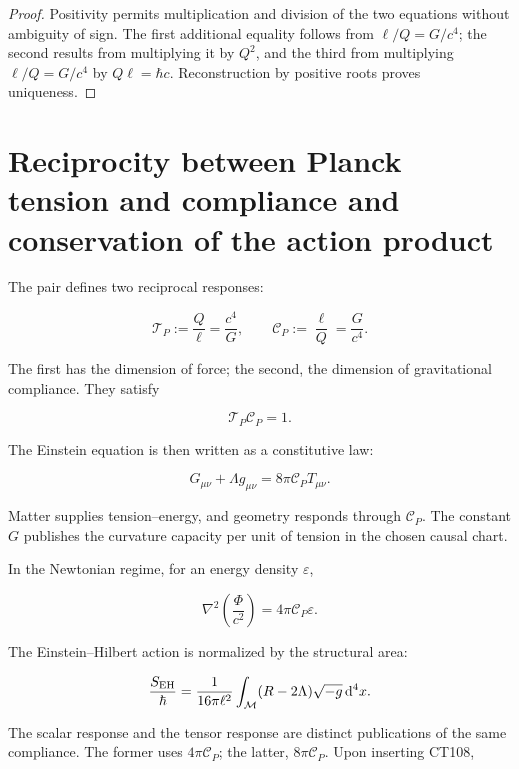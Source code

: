 \begin{proof}
Positivity permits multiplication and division of the two equations without
ambiguity of sign. The first additional equality follows from
\(\ell/Q=G/c^4\); the second results from multiplying it by \(Q^2\), and the
third from multiplying \(\ell/Q=G/c^4\) by
\(Q\ell=\hbar c\). Reconstruction by positive roots proves
uniqueness.
\end{proof}

\section{Reciprocity between Planck tension and compliance and conservation of the action product}

The pair defines two reciprocal responses:

\begin{equation}
\mathscr T_P:=\frac{Q}{\ell}=\frac{c^4}{G},
\qquad
\mathscr C_P:=\frac{\ell}{Q}=\frac{G}{c^4}.
\label{eq:rm-tension-compliance}
\end{equation}

The first has the dimension of force; the second, the dimension of
gravitational compliance. They satisfy

\[
\mathscr T_P\mathscr C_P=1.
\]

The Einstein equation is then written as a constitutive law:

\begin{equation}
\boxed{
G_{\mu\nu}+\Lambda g_{\mu\nu}
=8\pi\mathscr C_P T_{\mu\nu}.}
\label{eq:rm-einstein-compliance}
\end{equation}

Matter supplies tension--energy, and geometry responds through
\(\mathscr C_P\). The constant \(G\) publishes the curvature capacity per
unit of tension in the chosen causal chart.

In the Newtonian regime, for an energy density
\(\varepsilon\),

\[
\nabla^2\!\left(\frac{\Phi}{c^2}\right)
=4\pi\mathscr C_P\varepsilon.
\]

The Einstein--Hilbert action is normalized by the structural area:

\begin{equation}
\frac{S_{\rm EH}}{\hbar}
=\frac{1}{16\pi\ell^2}
\int_{\mathcal M}(R-2\Lambda)\sqrt{-g}\,\mathrm d^4x.
\label{eq:rm-eh-area}
\end{equation}

The scalar response and the tensor response are distinct publications
of the same compliance. The former uses \(4\pi\mathscr C_P\); the latter,
\(8\pi\mathscr C_P\). Upon inserting CT108,

